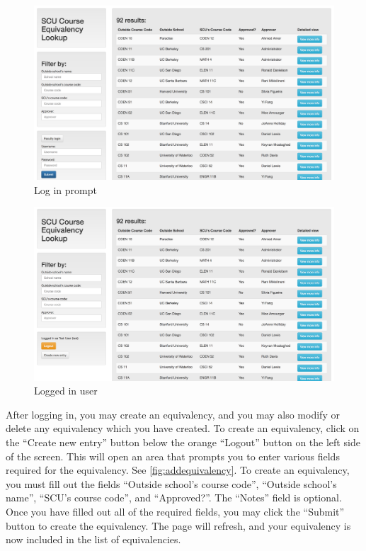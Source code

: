 \documentclass{article}
\begin{document}
\begin{figure}[h]
\includegraphics[width=15cm]{login}
\centering
\caption{Log in prompt}
\label{fig:login}
\end{figure}

\begin{figure}[h]
\includegraphics[width=15cm]{loggedin}
\centering
\caption{Logged in user}
\label{fig:loggedin}
\end{figure}

\par After logging in, you may create an equivalency, and you may also modify or
delete any equivalency which you have created. To create an equivalency, click
on the ``Create new entry'' button below the orange ``Logout'' button on the left
side of the screen. This will open an area that prompts you to enter various
fields required for the equivalency. See \cref{fig:addequivalency}. To create an equivalency, you
must fill out the fields ``Outside school's course code'',
``Outside school's name'', ``SCU's course code'', and ``Approved?''.
The ``Notes'' field is optional. Once you have filled out all of the required
fields, you may click the ``Submit'' button to create the equivalency. The page
will refresh, and your equivalency is now included in the list of equivalencies.
\end{document}
